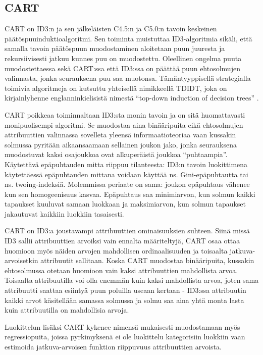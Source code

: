 \documentclass[12pt,finnish]{tktltiki2}
\theoremstyle{definition}
\theoremstyle{remark}
\begin{document}
\subsection{CART}
CART \cite{CART} on ID3:n ja sen jälkeläisten C4.5:n ja C5.0:n tavoin keskeinen päätöspuuinduktioalgoritmi. Sen toiminta muistuttaa ID3-algoritmia sikäli, että
samalla tavoin päätöspuun muodostaminen aloitetaan puun juuresta ja rekursiivisesti jatkuu kunnes puu on
muodostettu. Oleellinen ongelma puuta muodostettaessa sekä CART:ssa että ID3:ssa on päättää puun ehtosolmujen valinnasta,
jonka seurauksena puu saa muotonsa. Tämäntyyppisellä strategialla toimivia algoritmeja on kutsuttu yhteisellä nimikkeellä TDIDT, joka on
kirjainlyhenne englanninkielisistä nimestä ``top-down induction of decision trees'' \cite{quinlan}.

CART poikkeaa toiminnaltaan ID3:sta monin tavoin ja on sitä huomattavasti monipuolisempi algoritmi.
Se muodostaa aina binääripuita eikä ehtosolmujen attribuuttien valinnassa sovelleta yleensä informaatioteoriaa vaan
kussakin solmussa pyritään aikaansaamaan sellainen joukon jako, jonka seurauksena muodostuvat kaksi osajoukkoa ovat alkuperäistä
joukkoa ``puhtaampia''. Käytettävä epäpuhtauden mitta riippuu tilanteesta: ID3:n tavoin luokittimena käytettäessä
epäpuhtauden mittana voidaan käyttää ns. Gini-epäpuhtautta tai ns. twoing-indeksiä. Molemmissa periaate on sama:
joukon epäpuhtaus vähenee kun sen homogeenisuus kasvaa. Epäpuhtaus saa minimiarvon, kun solmun kaikki tapaukset kuuluvat samaan
luokkaan ja maksimiarvon, kun solmun tapaukset jakautuvat kaikkiin luokkiin tasaisesti.

CART on ID3:a joustavampi attribuuttien ominaisuuksien suhteen. Siinä missä ID3 sallii attribuuttien
arvoiksi vain ennalta määriteltyjä, CART osaa ottaa huomioon myös näiden arvojen mahdollisen
ordinaalisuuden ja toisaalta jatkuva-arvoisetkin attribuutit sallitaan. Koska CART muodostaa
binääripuita, kussakin ehtosolmussa otetaan huomioon vain kaksi attribuuttien mahdollista arvoa. Toisaalta
attribuutilla voi olla enemmän kuin kaksi mahdollista arvoa, joten sama attribuutti saattaa esiintyä puun
poluilla useaan kertaan - ID3:ssa attribuutin kaikki arvot käsitellään samassa solmussa ja solmu
saa aina yhtä monta lasta kuin attribuutilla on mahdollisia arvoja.

Luokittelun lisäksi CART kykenee nimensä mukaisesti muodostamaan myös regressiopuita, joissa pyrkimyksenä
ei ole luokittelu kategorisiin luokkiin vaan estimoida jatkuva-arvoisen funktion riippuvuus
attribuuttien arvoista. 
\end{document}
